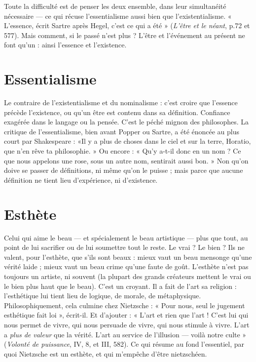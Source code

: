 Toute la difficulté est de penser les deux ensemble, dans leur simultanéité
nécessaire — ce qui récuse l’essentialisme aussi bien que l’existentialisme. « L’essence,
écrit Sartre après Hegel, c’est ce qui a été » ({\it L'être et le néant}, p.72
et 577). Mais comment, si le passé n’est plus ? L’être et l'événement au présent
ne font qu’un : ainsi l'essence et l’existence.

\section{Essentialisme}
Le contraire de l’existentialisme et du nominalisme : c’est
croire que l'essence précède l'existence, ou qu’un être est
contenu dans sa définition. Confiance exagérée dans le langage ou la pensée.
C’est le péché mignon des philosophes. La critique de l’essentialisme, bien
avant Popper ou Sartre, a été énoncée au plus court par Shakespeare : «Il y a
plus de choses dans le ciel et sur la terre, Horatio, que n’en rêve ta
philosophie. » Ou encore : « Qu’y a-t-il donc en un nom ? Ce que nous appelons
une rose, sous un autre nom, sentirait aussi bon. » Non qu’on doive se
passer de définitions, ni même qu’on le puisse ; mais parce que aucune définition
ne tient lieu d’expérience, ni d’existence.

\section{Esthète}
Celui qui aime le beau — et spécialement le beau artistique — plus
que tout, au point de lui sacrifier ou de lui soumettre tout le
reste. Le vrai ? Le bien ? Ils ne valent, pour l’esthète, que s’ils sont beaux :
mieux vaut un beau mensonge qu’une vérité laide ; mieux vaut un beau crime
qu’une faute de goût. L’esthète n’est pas toujours un artiste, ni souvent (la plupart
des grands créateurs mettent le vrai ou le bien plus haut que le beau). C’est
un croyant. Il a fait de l’art sa religion : l'esthétique lui tient lieu de logique, de
morale, de métaphysique. Philosophiquement, cela culmine chez Nietzsche :
« Pour nous, seul le jugement esthétique fait loi », écrit-il. Et d’ajouter : « L'art
et rien que l’art ! C’est lui qui nous permet de vivre, qui nous persuade de vivre,
qui nous stimule à vivre. L'art a {\it plus de valeur} que la vérité. L'art au service
de l'illusion — voilà notre culte » ({\it Volonté de puissance}, IV, 8, et III, 582). Ce
qui résume au fond l'essentiel, par quoi Nietzsche est un esthète, et qui
m’empêche d’être nietzschéen.

